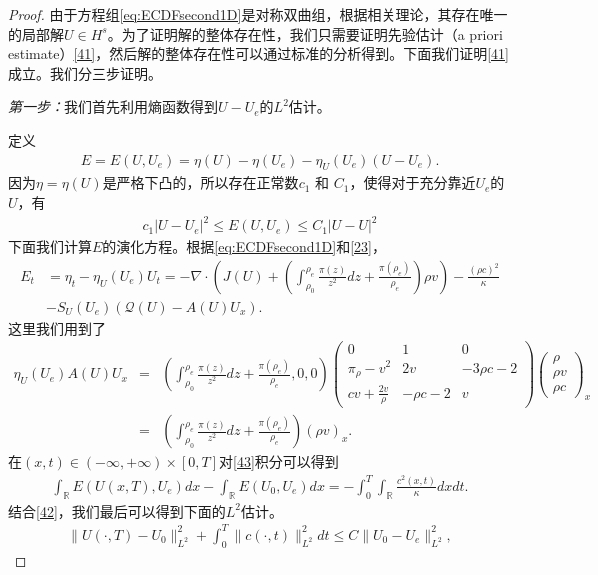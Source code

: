 \begin{proof}
由于方程组\eqref{eq:ECDFsecond1D}是对称双曲组，根据相关理论\cite{majda1984compressible, kato1975cauchy}，其存在唯一的局部解$U \in H^s$。为了证明解的整体存在性，我们只需要证明先验估计（a priori estimate）\eqref{41}，然后解的整体存在性可以通过标准的分析得到\cite{yong2004entropy}。下面我们证明\eqref{41}成立。我们分三步证明。

\emph{第一步：}我们首先利用熵函数得到$U-U_e$的$L^2$估计。

定义
\begin{eqnarray*}
E=E(U,U_e) = \eta(U)-\eta(U_e)-\eta_U(U_e)(U-U_e).
\end{eqnarray*}
因为$\eta=\eta(U)$是严格下凸的，所以存在正常数$c_1$ 和 $C_1$，使得对于充分靠近$U_e$的$U$，有
\begin{eqnarray}\label{42}
c_1 |U-U_e|^2 \le E(U,U_e) \le C_1 |U-U|^2
\end{eqnarray}
下面我们计算$E$的演化方程。根据\eqref{eq:ECDFsecond1D}和\eqref{23}，
\begin{eqnarray}\label{43}
E_t &= \eta_t - \eta_U(U_e)U_t = -\nabla \cdot \left(J(U) +( \int_{\rho_0}^{\rho_e} \frac{\pi(z)}{z^2} dz + \frac{\pi(\rho_e)}{\rho_e})\rho v \right) - \frac{(\rho c)^2}{\kappa} \nonumber \\
& - S_U(U_e)(\mathcal{Q}(U) - A(U)U_x).
\end{eqnarray}
这里我们用到了
\begin{eqnarray*}
\eta_U(U_e) A(U) U_x &=& ( \int_{\rho_0}^{\rho_e} \frac{\pi(z)}{z^2} dz + \frac{\pi(\rho_e)}{\rho_e}, 0, 0)
\left( \begin{array}{ccc}
		0 & 1 & 0 \\
		\pi_\rho - v^2 & 2v & -3 \rho c - 2 \\
		cv + \frac{2 v}{\rho} & -  \rho c - 2 & v 
	\end{array}\right)
\left( \begin{array}{ccc}
\rho \\ \rho v \\ \rho c \end{array} \right)_x \\
&=& \left( \int_{\rho_0}^{\rho_e} \frac{\pi(z)}{z^2} dz + \frac{\pi(\rho_e)}{\rho_e}\right) (\rho v )_x.
\end{eqnarray*}
在$(x, t)\in(-\infty, + \infty)\times[0,T]$对\eqref{43}积分可以得到
\begin{eqnarray*}
\int_\mathbb{R}E(U(x, T), U_e)dx - \int_\mathbb{R} E(U_0, U_e)dx = - \int_0^T\int_\mathbb{R} \frac{c^2(x, t)}{\kappa} dx dt.
\end{eqnarray*}
结合\eqref{42}，我们最后可以得到下面的$L^2$估计。
\begin{eqnarray}\label{44}
\|U(\cdot, T)-U_0\|^2_{L^2} + \int_0^T \|c(\cdot, t)\|^2_{L^2}dt \le C\|U_0 - U_e\|^2_{L^2},
\end{eqnarray}


\end{proof}
